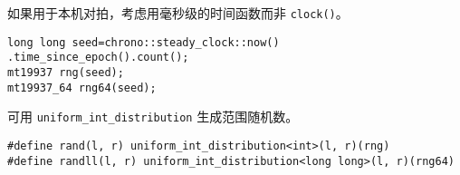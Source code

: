 如果用于本机对拍，考虑用毫秒级的时间函数而非 \texttt{clock()}。
\begin{verbatim}
long long seed=chrono::steady_clock::now() .time_since_epoch().count();
mt19937 rng(seed);
mt19937_64 rng64(seed);
\end{verbatim}
可用 \texttt{uniform\_int\_distribution} 生成范围随机数。
\begin{verbatim}
#define rand(l, r) uniform_int_distribution<int>(l, r)(rng)
#define randll(l, r) uniform_int_distribution<long long>(l, r)(rng64)
\end{verbatim}